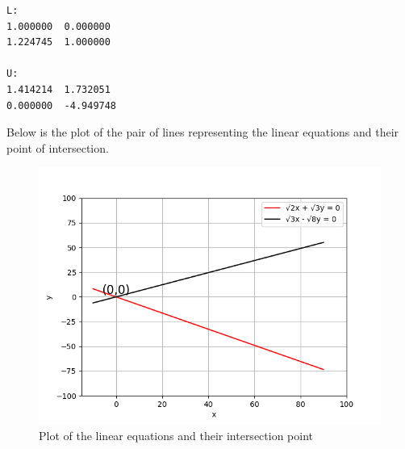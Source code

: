 \documentclass[journal]{IEEEtran}
\begin{document}
\begin{lstlisting}
L:
1.000000  0.000000 
1.224745  1.000000 

U:
1.414214  1.732051 
0.000000  -4.949748	
\end{lstlisting}

Below is the plot of the pair of lines representing the linear equations and their point of intersection.
\begin{figure}[h!]
	\centering
	\includegraphics[width=1\columnwidth]{figs/simulated.png}
	\caption{Plot of the linear equations and their intersection point}
	\label{label}
\end{figure}
\end{document}
